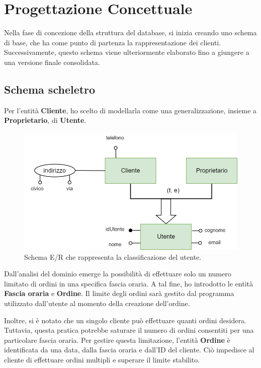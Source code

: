 \documentclass[a4paper,12pt, oneside]{article}
\begin{document}
\section{Progettazione Concettuale}

Nella fase di concezione della struttura del database, si inizia
creando uno schema di base, che ha come punto di partenza la
rappresentazione dei clienti. Successivamente, questo schema
viene ulteriormente elaborato fino a giungere a una versione
finale consolidata.

\subsection{Schema scheletro}

Per l'entità \textbf{Cliente}, ho scelto di modellarla come una
generalizzazione, insieme a \textbf{Proprietario}, di \textbf{Utente}.

\begin{figure}[ht]
    \centering
    \includegraphics[width=1\textwidth]{images/diagramma_cliente.png}
    \caption{Schema E/R che rappresenta la classificazione del utente.}
    \label{fig:diagramma_cliente}
\end{figure}

Dall'analisi del dominio emerge la possibilità di effettuare solo
un numero limitato di ordini in una specifica fascia oraria. A tal
fine, ho introdotto le entità \textbf{Fascia oraria} e
\textbf{Ordine}. Il limite degli ordini sarà gestito dal programma
utilizzato dall'utente al momento della creazione dell'ordine.

Inoltre, si è notato che un singolo cliente può effettuare quanti
ordini desidera. Tuttavia, questa pratica potrebbe saturare il
numero di ordini consentiti per una particolare fascia oraria.
Per gestire questa limitazione, l'entità \textbf{Ordine} è
identificata da una data, dalla fascia oraria e dall'ID del
cliente. Ciò impedisce al cliente di effettuare ordini multipli
e superare il limite stabilito.
\end{document}
